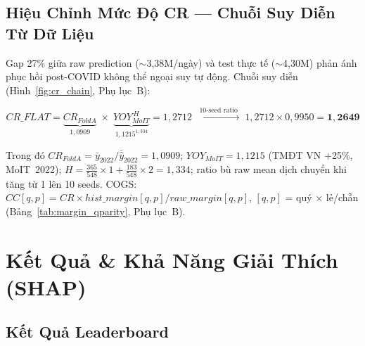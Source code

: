\documentclass{article}
\begin{document}
\vspace{-2pt}
\subsection{Hiệu Chỉnh Mức Độ CR — Chuỗi Suy Diễn Từ Dữ Liệu}
\vspace{-2pt}

Gap 27\% giữa raw prediction ($\sim$3,38M/ngày) và test thực tế ($\sim$4,30M) phản ánh phục hồi post-COVID không thể ngoại suy tự động. Chuỗi suy diễn (Hình~\ref{fig:cr_chain}, Phụ lục~B):

\vspace{-4pt}
\begin{equation}
CR\_FLAT = \underbrace{CR_{FoldA}}_{\displaystyle 1{,}0909} \;\times\; \underbrace{YOY_{MoIT}^{\,H}}_{\displaystyle 1{,}1215^{1{,}334}} = 1{,}2712 \;\xrightarrow{\;\text{10-seed ratio}\;}\; 1{,}2712 \times 0{,}9950 = \mathbf{1{,}2649}
\end{equation}
\vspace{-4pt}

Trong đó $CR_{FoldA}=\bar{y}_{2022}/\bar{\hat{y}}_{2022}=1{,}0909$; $YOY_{MoIT}=1{,}1215$ (TMĐT VN +25\%, MoIT~2022); $H=\tfrac{365}{548}{\times}1+\tfrac{183}{548}{\times}2=1{,}334$; ratio bù raw mean dịch chuyển khi tăng từ 1 lên 10 seeds. COGS: $CC[q,p]=CR{\times}hist\_margin[q,p]/raw\_margin[q,p]$, $[q,p]$ = quý × lẻ/chẵn (Bảng~\ref{tab:margin_qparity}, Phụ lục~B).

\section{Kết Quả \& Khả Năng Giải Thích (SHAP)}

\vspace{-2pt}
\subsection{Kết Quả Leaderboard}
\vspace{-2pt}
\end{document}
